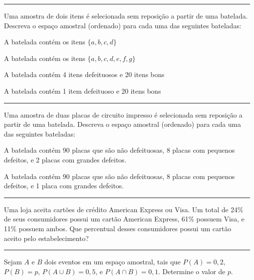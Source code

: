\documentclass[a4paper,11pt,fleqn]{article}\usepackage[]{graphicx}\usepackage[]{color}
\theoremstyle{definition}
\begin{document}
\begin{compactenum}
\vspace{0.3cm}
\hrule
\vspace{0.3cm}

\item Uma amostra de dois itens é selecionada sem reposição a partir de
  uma batelada. Descreva o espaço amostral (ordenado) para cada uma das
  seguintes bateladas:
  \begin{compactenum}
  \item A batelada contém os itens $\{a, b, c, d\}$
  \item A batelada contém os itens $\{a, b, c, d, e, f, g\}$
  \item A batelada contém 4 itens defeituosos e 20 itens bons
  \item A batelada contém 1 item defeituoso e 20 itens bons
  \end{compactenum}

\vspace{0.3cm}
\hrule
\vspace{0.3cm}

\item Uma amostra de duas placas de circuito impresso é selecionada sem
  reposição a partir de uma batelada. Descreva o espaço amostral
  (ordenado) para cada uma das seguintes bateladas:
  \begin{compactenum}
  \item A batelada contém 90 placas que são não defeituosas, 8 placas
    com pequenos defeitos, e 2 placas com grandes defeitos.
  \item A batelada contém 90 placas que são não defeituosas, 8 placas
    com pequenos defeitos, e 1 placa com grandes defeitos.
  \end{compactenum}

\vspace{0.3cm}
\hrule
\vspace{0.3cm}

\item Uma loja aceita cartões de crédito American Express ou Visa. Um
  total de 24\% de seus consumidores possui um cartão American Express,
  61\% possuem Visa, e 11\% possuem ambos. Que percentual desses
  consumidores possui um cartão aceito pelo estabelecimento?

\vspace{0.3cm}
\hrule
\vspace{0.3cm}

\item Sejam $A$ e $B$ dois eventos em um espaço amostral, tais que $P(A)
  = 0,2$, $P(B) = p$, $P(A \cup B) = 0,5$, e $P(A \cap B) =
  0,1$. Determine o valor de $p$.


\end{compactenum}
\end{document}
